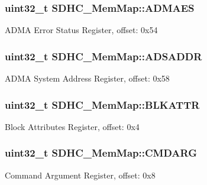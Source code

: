 \subsubsection[{A\+D\+M\+A\+E\+S}]{\setlength{\rightskip}{0pt plus 5cm}uint32\+\_\+t S\+D\+H\+C\+\_\+\+Mem\+Map\+::\+A\+D\+M\+A\+E\+S}\label{struct_s_d_h_c___mem_map_a23a2344d2bcccb1d642214ffa2d011cc}
A\+D\+M\+A Error Status Register, offset\+: 0x54 \hypertarget{struct_s_d_h_c___mem_map_add3530fe9767f7ef0f6401c049cd0d6f}{}
\subsubsection[{A\+D\+S\+A\+D\+D\+R}]{\setlength{\rightskip}{0pt plus 5cm}uint32\+\_\+t S\+D\+H\+C\+\_\+\+Mem\+Map\+::\+A\+D\+S\+A\+D\+D\+R}\label{struct_s_d_h_c___mem_map_add3530fe9767f7ef0f6401c049cd0d6f}
A\+D\+M\+A System Address Register, offset\+: 0x58 \hypertarget{struct_s_d_h_c___mem_map_a0a3c9777e2dc6450d432235b772eddda}{}
\subsubsection[{B\+L\+K\+A\+T\+T\+R}]{\setlength{\rightskip}{0pt plus 5cm}uint32\+\_\+t S\+D\+H\+C\+\_\+\+Mem\+Map\+::\+B\+L\+K\+A\+T\+T\+R}\label{struct_s_d_h_c___mem_map_a0a3c9777e2dc6450d432235b772eddda}
Block Attributes Register, offset\+: 0x4 \hypertarget{struct_s_d_h_c___mem_map_a74b8ea7db5c12a06f19e8054bba5c2b3}{}
\subsubsection[{C\+M\+D\+A\+R\+G}]{\setlength{\rightskip}{0pt plus 5cm}uint32\+\_\+t S\+D\+H\+C\+\_\+\+Mem\+Map\+::\+C\+M\+D\+A\+R\+G}\label{struct_s_d_h_c___mem_map_a74b8ea7db5c12a06f19e8054bba5c2b3}
Command Argument Register, offset\+: 0x8 \hypertarget{struct_s_d_h_c___mem_map_ad68e1706e76585042d163c6798c0f545}{}
